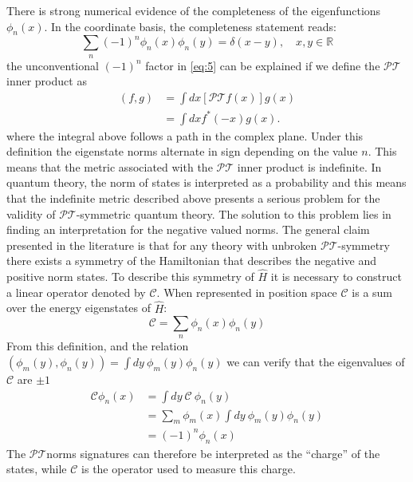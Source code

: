 \documentclass[12pt, a4paper]{report}
\newcommand\PT{\(\mathcal{PT}\)}
\newcommand\CC{\(\mathcal{C}\)}
\begin{document}
There is strong numerical evidence of the completeness of the eigenfunctions $\phi_n(x)$\cite{ComplexExtension}\cite{Bender_2004}\cite{Brody_2013}. In the coordinate basis, the completeness statement reads:
\begin{equation}\label{eq:5}
\sum_{n}(-1)^{n}\phi_n(x)\phi_n(y) = \delta(x-y),\quad x, y \in \mathbb{R}
\end{equation}
the unconventional $(-1)^n$ factor in \ref{eq:5} can be explained if we define the \PT\:inner product as
\begin{align}\label{eq:6}
\left ( f, g \right )  & = \int dx \left [ \mathcal{PT} f(x) \right ] g(x)\nonumber\\
                       & = \int dx f^{*}(-x) g(x).
\end{align}
where the integral above follows a path in the complex plane. Under this definition the eigenstate norms alternate in sign depending on the value $n$. This means that the metric associated with the \PT\: inner product is indefinite\cite{Bender_2004}\cite{Critique}.
In quantum theory, the norm of states is interpreted as a probability and this means that the indefinite metric described above presents a serious problem for the validity of \PT-symmetric quantum theory. The solution to this problem lies in finding an interpretation for
the negative valued norms\cite{PT-symmetricQM}. The general claim presented in the literature is that for any theory with unbroken \PT-symmetry there
exists a symmetry of the Hamiltonian that describes the negative and positive norm states. To describe this symmetry of $\hat{H}$ it is necessary to construct a linear operator denoted by \CC\cite{MustaHbeHermitian}\cite{ComplexExtension}\cite{Bender_2004}. When represented in position space \CC\: is a sum over the energy eigenstates of $\hat{H}$:
\begin{equation}\label{eq:7}
\mathcal{C} = \sum_n \phi_n(x)\phi_n(y)
\end{equation}
From this definition, and the relation $(\phi_m(y), \phi_n(y)) = \int dy\:\phi_m(y)\phi_n(y)$ we can verify that the eigenvalues of \CC\: are $\pm 1$
\begin{align}\label{eq:8}
\mathcal{C} \phi_n(x) & = \int dy\:\mathcal{C}\:\phi_n(y)\nonumber \\
& = \sum_{m}\phi_m(x)\int dy\:\phi_m(y) \phi_n(y)\nonumber \\
& = (-1)^n \phi_n(x)
\end{align}
The \PT\:norms signatures can therefore be interpreted as the ``charge'' of the states, while \CC\: is the operator used to measure this charge\cite{Bender_2004}.
\end{document}
